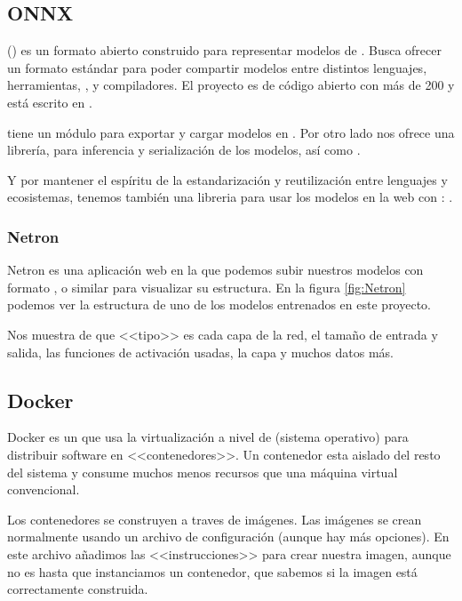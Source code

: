 \subsection{ONNX}\label{tool:ONNX}

 () es un formato abierto construido para representar modelos de . Busca ofrecer un formato estándar para poder compartir modelos entre distintos lenguajes, herramientas, ,  y compiladores. El proyecto es de código abierto con más de 200  y está escrito en .


 tiene un módulo para exportar y cargar modelos en . Por otro lado  nos ofrece una librería,  para inferencia y serialización de los modelos, así como .

Y por mantener el espíritu de la estandarización y reutilización entre lenguajes y ecosistemas, tenemos también una libreria para usar los modelos en la web con : .

\subsubsection{Netron}

Netron es una aplicación web en la que podemos subir nuestros modelos con formato ,  o similar para visualizar su estructura. En la figura \ref{fig:Netron} podemos ver la estructura de uno de los modelos entrenados en este proyecto.


Nos muestra de que <<tipo>> es cada capa de la red, el tamaño de entrada y salida, las funciones de activación usadas, la capa  y muchos datos más.

\subsection{Docker}

Docker es un  que usa la virtualización a nivel de  (sistema operativo) para distribuir software en <<contenedores>>. Un contenedor esta aislado del resto del sistema y consume muchos menos recursos que una máquina virtual convencional.

Los contenedores se construyen a traves de imágenes. Las imágenes se crean normalmente usando un archivo de configuración  (aunque hay más opciones). En este archivo añadimos las <<instrucciones>> para crear nuestra imagen, aunque no es hasta que instanciamos un contenedor, que sabemos si la imagen está correctamente construida.

